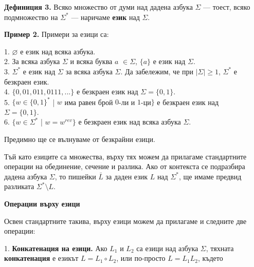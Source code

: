 \documentclass[openany]{book}
\begin{document}
    \textbf{Дефиниция 3.} Всяко множество от думи над дадена азбука $\Sigma$
    — тоест, всяко подмножество на $\Sigma^*$ — наричаме \textbf{език} над $\Sigma$.

    \vspace{5pt}

    \textbf{Пример 2.} Примери за езици са: \\
    
    \vspace{5pt}

    1. $\varnothing$ е език над всяка азбука. \\
    2. За всяка азбука $\Sigma$ и всяка буква $a$ $\in \Sigma$, $\{a\}$ е език над $\Sigma$. \\
    3. $\Sigma^*$ е език над $\Sigma$ за всяка азбука $\Sigma$. Да забележим, че 
    при $|\Sigma| \geq 1$, $\Sigma^*$ е безкраен език. \\
    4. $\{0,01,011,0111,...\}$ е безкраен език над $\Sigma = \{0,1\}$. \\
    5. $\{w \in \{0,1\}^*$ | $w$ има равен брой $0$-ли и $1$-ци$\}$
    е безкраен език над \\ $\Sigma = \{0,1\}$. \\
    6. $\{w \in \Sigma^*$ | $w = w^{rev}\}$ е безкраен език над
    всяка азбука $\Sigma$.

    \vspace{5pt}

    Предимно ще се вълнуваме от безкрайни езици.

    \vspace{5pt}

    Тъй като езиците са множества, върху тях можем да прилагаме стандартните
    операции на обединение, сечение и разлика. Ако от контекста се подразбира
    дадена азбука $\Sigma$, то пишейки $\bar{L}$ за даден език $L$ над $\Sigma^*$,
    ще имаме предвид разликата $\Sigma^* \setminus L$.

    \vspace {30pt}

    \textbf{Операции върху езици}

    \vspace{5pt}

    Освен стандартните такива, върху езици можем да прилагаме и следните две операции:

    \vspace{5pt}

    1. \textbf{Конкатенация на езици.} Ако $L_1$ и $L_2$ са езици над азбука $\Sigma$,
    тяхната \textbf{конкатенация} е езикът $L = L_1 \circ L_2$, или по-просто $L = L_1L_2$, където
\end{document}
